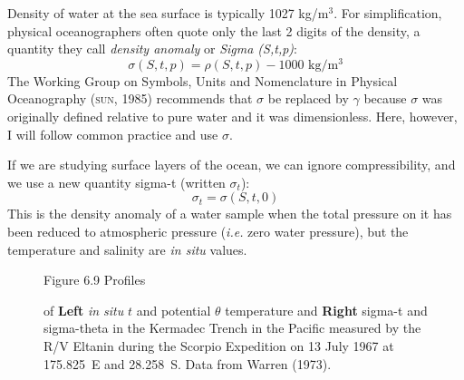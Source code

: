 Density of water at the sea surface is typically 1027 kg/m$^3$. For
simplification, physical oceanographers often quote only the last 2
digits of the density, a quantity they call \textit{density anomaly}
or \textit{Sigma (S,t,p)}:
\begin{equation}
\sigma(S,t,p) = \rho (S, t, p) - 1000 \text{\ kg/m$^3$}
\end{equation}
The Working Group on Symbols, Units and Nomenclature in Physical
Oceanography (\textsc{sun}, 1985) recommends that $\sigma$ be replaced
by $\gamma$ because $\sigma$ was originally defined relative to pure
water and it was dimensionless. Here, however, I will follow common
practice and use $\sigma$.

If we are studying surface layers of the ocean, we can ignore
compressibility, and we use a new quantity sigma-t (written $\sigma_t$):
\begin{equation}
\sigma _t =  \sigma(S,t,0)
\end{equation}
This is the density anomaly of a water sample when the total pressure
on it has been reduced to atmospheric pressure (\textit{i.e.} zero
water pressure), but the temperature and salinity are \textit{in situ}
values.

\begin{figure}[t!]
\footnotesize
Figure 6.9 Profiles \rule{0mm}{4ex}of \textbf{Left} \textit{in
  situ} $t$ and potential $\theta$ temperature and
\textbf{Right} sigma-t and sigma-theta in the Kermadec Trench in the
Pacific measured by the R/V Eltanin during the Scorpio Expedition on
13 July 1967 at 175.825\degrees\ E and 28.258\degrees\ S. Data from
Warren (1973).

\label{fig:thetaprofile}
\vspace{-4ex}
\end{figure}

